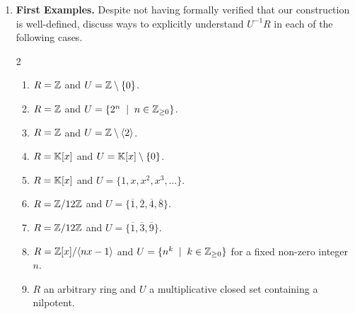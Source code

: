 \documentclass[12pt,reqno]{amsart}
\begin{document}
\begin{enumerate}[leftmargin=*]
\item \textbf{First Examples.} Despite not having formally verified that our construction is well-defined, discuss ways to explicitly understand $U^{-1}R$ in each of the following cases. 
\begin{multicols}{2}
\begin{enumerate}
	\item $R=\mathbb{Z}$ and $U=\mathbb{Z}\setminus\{0\}$.
	\item $R=\mathbb{Z}$ and $U=\{2^{n}\;\;|\;\; n\in \mathbb{Z}_{\geq0}\}$.
	\item $R=\mathbb{Z}$ and $U=\mathbb{Z}\setminus\langle 2 \rangle$.
	\item $R=\mathbb{K}[x]$ and $U=\mathbb{K}[x]\setminus\{0\}$.
	\item $R=\mathbb{K}[x]$ and $U=\{1,x,x^2,x^3,\ldots\}$.
	\item $R=\mathbb{Z}/12\mathbb{Z}$ and $U=\{\overline{1},\overline{2},\overline{4},\overline{8}\}$.
	\item $R=\mathbb{Z}/12\mathbb{Z}$ and $U=\{\overline{1},\overline{3},\overline{9}\}$.
	\item $R=\mathbb{Z}[x]/\langle nx-1\rangle$ and $U=\{n^k \;\; | \;\; k \in \mathbb{Z}_{\geq0}\}$ for a fixed non-zero integer $n$.
	\item\label{ex-pt:localize-nilpotent} $R$ an arbitrary ring and $U$ a multiplicative closed set containing a nilpotent. 
\end{enumerate}
\end{multicols}


\end{enumerate}
\end{document}
